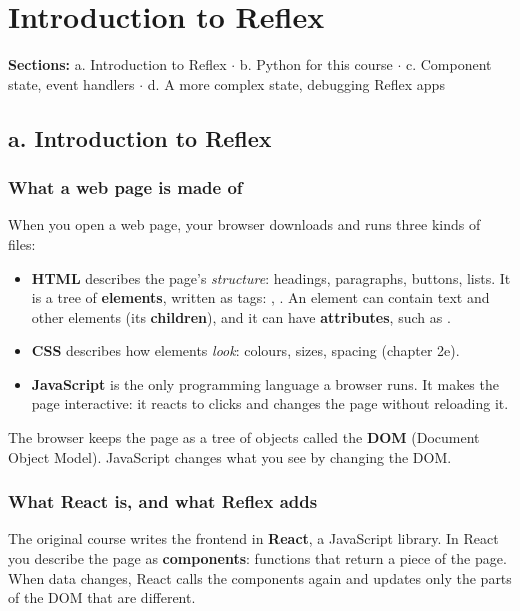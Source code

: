 \chapter{Introduction to Reflex}

\textbf{Sections:} a. Introduction to Reflex $\cdot$ b. Python for this course $\cdot$ c. Component state, event handlers $\cdot$ d. A more complex state, debugging Reflex apps

\section{a. Introduction to Reflex}

\subsection{What a web page is made of}

When you open a web page, your browser downloads and runs three kinds of files:

\begin{itemize}
\item \textbf{HTML} describes the page's \emph{structure}: headings, paragraphs, buttons, lists. It is a tree of \textbf{elements}, written as tags: , . An element can contain text and other elements (its \textbf{children}), and it can have \textbf{attributes}, such as .
\item \textbf{CSS} describes how elements \emph{look}: colours, sizes, spacing (chapter 2e).
\item \textbf{JavaScript} is the only programming language a browser runs. It makes the page interactive: it reacts to clicks and changes the page without reloading it.
\end{itemize}

The browser keeps the page as a tree of objects called the \textbf{DOM} (Document Object Model). JavaScript changes what you see by changing the DOM.

\subsection{What React is, and what Reflex adds}

The original course writes the frontend in \textbf{React}, a JavaScript library. In React you describe the page as \textbf{components}: functions that return a piece of the page. When data changes, React calls the components again and updates only the parts of the DOM that are different.

